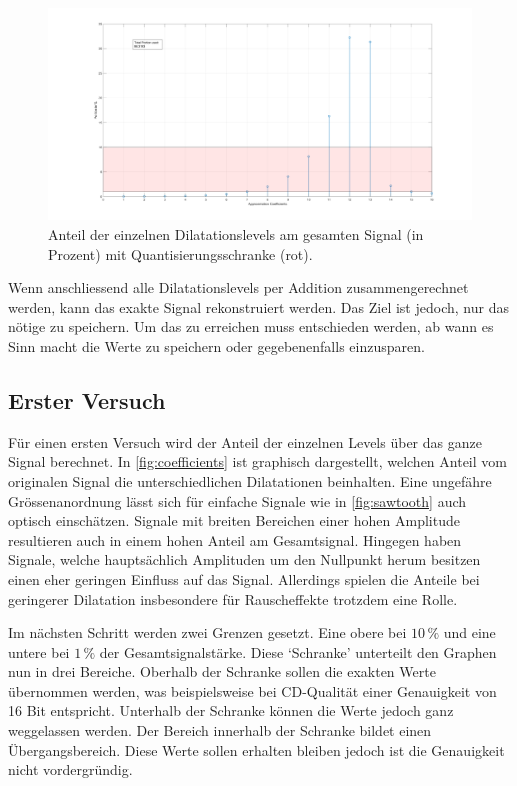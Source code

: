 \begin{refsection}
\begin{figure}
	\centering
	\includegraphics[width=\linewidth]{papers/compress/Bilder/recCoefs}
	\caption{Anteil der einzelnen Dilatationslevels am gesamten Signal (in Prozent) mit Quantisierungsschranke (rot).}
	\label{fig:coefficients}
\end{figure} 

Wenn anschliessend alle Dilatationslevels per Addition zusammengerechnet werden, kann das exakte Signal rekonstruiert werden.
Das Ziel ist jedoch, nur das nötige zu speichern.
Um das zu erreichen muss entschieden werden, ab wann es Sinn macht die Werte zu speichern oder gegebenenfalls einzusparen.

\subsection{Erster Versuch}
Für einen ersten Versuch wird der Anteil der einzelnen Levels über das ganze Signal berechnet.
In \autoref{fig:coefficients} ist graphisch dargestellt, welchen Anteil vom originalen Signal die unterschiedlichen Dilatationen beinhalten.
Eine ungefähre Grössenanordnung lässt sich für einfache Signale wie in \autoref{fig:sawtooth} auch optisch einschätzen.
Signale mit breiten Bereichen einer hohen Amplitude resultieren auch in einem hohen Anteil am Gesamtsignal. 
Hingegen haben Signale, welche hauptsächlich Amplituden um den Nullpunkt herum besitzen einen eher geringen Einfluss auf das Signal.
Allerdings spielen die Anteile bei geringerer Dilatation insbesondere für Rauscheffekte trotzdem eine Rolle.

Im nächsten Schritt werden zwei Grenzen gesetzt.
Eine obere bei  $10\,\text{\%}$ und eine untere bei $1\,\text{\%}$ der Gesamtsignalstärke.
Diese `Schranke' unterteilt den Graphen nun in drei Bereiche. 
Oberhalb der Schranke sollen die exakten Werte übernommen werden, was beispielsweise bei CD-Qualität einer Genauigkeit von 16 Bit entspricht.
Unterhalb der Schranke können die Werte jedoch ganz weggelassen werden.
Der Bereich innerhalb der Schranke bildet einen Übergangsbereich.
Diese Werte sollen erhalten bleiben jedoch ist die Genauigkeit nicht vordergründig.


\end{refsection}
